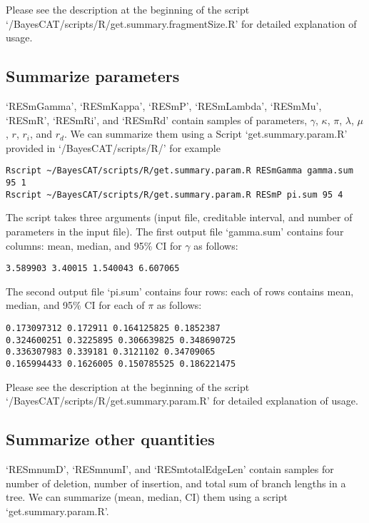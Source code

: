 \documentclass[11pt]{article}
\begin{document}
Please see the description at the beginning of the script `/BayesCAT/scripts/R/get.summary.fragmentSize.R' for detailed explanation of usage.

\subsection{Summarize parameters}
\label{sec-3-6}
`RESmGamma', `RESmKappa', `RESmP', `RESmLambda', `RESmMu', `RESmR', `RESmRi',  and `RESmRd' contain samples of parameters, $\gamma$, $\kappa$, $\pi$, $\lambda$, $\mu$, $r$, $r_i$, and $r_d$. We can summarize them using a Script `get.summary.param.R' provided in `/BayesCAT/scripts/R/' for example
\begin{lstlisting}
Rscript ~/BayesCAT/scripts/R/get.summary.param.R RESmGamma gamma.sum 95 1
Rscript ~/BayesCAT/scripts/R/get.summary.param.R RESmP pi.sum 95 4
\end{lstlisting}
The script takes three arguments (input file, creditable interval, and number of parameters in the input file). The first output file `gamma.sum' contains four columns: mean, median, and 95\% CI for $\gamma$ as follows:
\begin{lstlisting}
3.589903 3.40015 1.540043 6.607065
\end{lstlisting}

The second output file `pi.sum' contains four rows: each of rows contains mean, median, and 95\% CI for each of $\pi$ as follows:
\begin{lstlisting}
0.173097312 0.172911 0.164125825 0.1852387
0.324600251 0.3225895 0.306639825 0.348690725
0.336307983 0.339181 0.3121102 0.34709065
0.165994433 0.1626005 0.150785525 0.186221475
\end{lstlisting}

Please see the description at the beginning of the script `/BayesCAT/scripts/R/get.summary.param.R' for detailed explanation of usage.

\subsection{Summarize other quantities}
\label{sec-3-7}
`RESmnumD', `RESmnumI', and `RESmtotalEdgeLen' contain samples for number of deletion, number of insertion, and total sum of branch lengths in a tree. We can summarize (mean, median, CI) them using a script `get.summary.param.R'.
\end{document}

